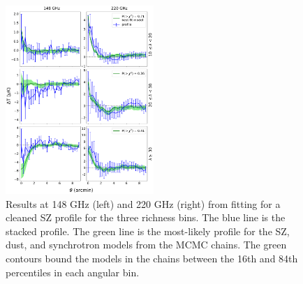 \documentclass[a4paper,fleqn,usenatbib]{mnras}
\begin{document}
\begin{figure}
  \centering
  \includegraphics[width=0.5\textwidth]{profs_models_ncut_all_20190410.pdf}
  \caption{Results at 148 GHz (left) and 220 GHz (right) from fitting for a cleaned SZ profile for the three richness bins. The blue line is the stacked profile. The green line is the most-likely profile for the SZ, dust, and synchrotron models from the MCMC chains. The green contours bound the models in the chains between the 16th and 84th percentiles in each angular bin.}
  \label{fig:mcmcprof}
\end{figure}
\end{document}
